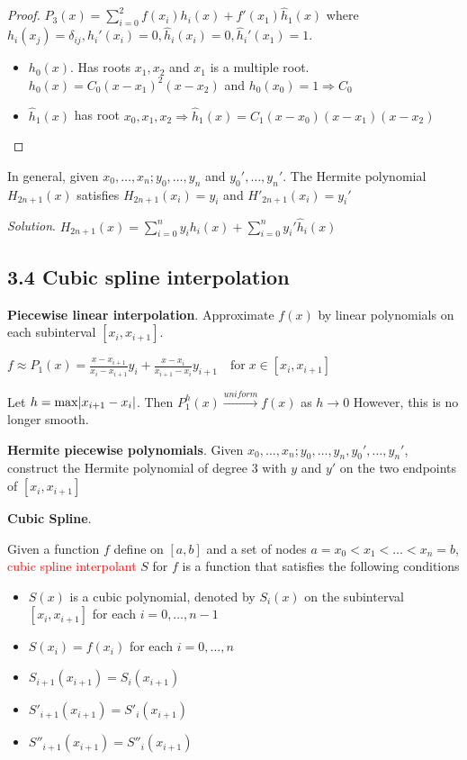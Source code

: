 \documentclass[11pt]{article}
\begin{document}
\begin{proof}
$P_3(x)=\displaystyle\sum_{i=0}^2f(x_i)h_i(x)+f'(x_1)\hat{h}_1(x)$ where
$h_i(x_j)=\delta_{ij},h_i'(x_i)=0,\hat{h}_i(x_i)=0,\hat{h}_i'(x_1)=1$.
\begin{itemize}
\item $h_0(x)$. Has roots $x_1,x_2$ and $x_1$ is a multiple root.
      $h_0(x)=C_0(x-x_1)^2(x-x_2)$ and $h_0(x_0)=1\Longrightarrow C_0$
\item $\hat{h}_1(x)$ has root $x_0,x_1,x_2\Longrightarrow 
      \hat{h}_1(x)=C_1(x-x_0)(x-x_1)(x-x_2)$
\end{itemize}
\end{proof}

In general, given \(x_0,\dots,x_n;y_0,\dots,y_n\) and \(y_0',\dots,y_n'\). The
Hermite polynomial \(H_{2n+1}(x)\) satisfies \(H_{2n+1}(x_i)=y_i\) and
\(H'_{2n+1}(x_i)=y_i'\) 

\emph{Solution}.
\(H_{2n+1}(x)=\displaystyle\sum_{i=0}^ny_ih_i(x)+\displaystyle\sum_{i=0}^ny_i'
   \hat{h}_i(x)\)
\subsection{3.4 Cubic spline interpolation}
\label{sec:org52512c7}
\textbf{Piecewise linear interpolation}. Approximate \(f(x)\) by linear polynomials on
each subinterval \([x_i,x_{i+1}]\).

\(f\approx P_1(x)=\frac{x-x_{i+1}}{x_i-x_{i+1}}y_i+\frac{x-x_i}
   {x_{i+1}-x_i}y_{i+1} \quad\text{for} \;x\in[x_i,x_{i+1}]\) 

Let \(h=\max\abs{x_{i+1}-x_i}\). Then \(P_1^h(x)\xrightarrow{uniform} f(x)\) as
\(h\to 0\) 
However, this is no longer smooth.

\textbf{Hermite piecewise polynomials}. Given
\(x_0,\dots,x_n;y_0,\dots,y_n,y_0',\dots,y_n'\), construct the Hermite
polynomial of degree 3 with \(y\) and \(y'\) on the two endpoints of
\([x_i,x_{i+1}]\)

\textbf{Cubic Spline}.
\begin{definition}
Given a function $f$ define on $[a,b]$ and a set of nodes $a=x_0<x_1<\dots<x_n=b$,
\textcolor{red}{cubic spline interpolant} $S$ for $f$ is a function that satisfies
the following conditions
\begin{itemize}
\item $S(x)$ is a cubic polynomial, denoted by $S_i(x)$ on the subinterval
$[x_i,x_{i+1}]$ for each $i=0,\dots,n-1$
\item $S(x_i)=f(x_i)$ for each $i=0,\dots, n$
\item $S_{i+1}(x_{i+1})=S_i(x_{i+1})$
\item $S'_{i+1}(x_{i+1})=S'_i(x_{i+1})$
\item $S''_{i+1}(x_{i+1})=S''_i(x_{i+1})$
\end{itemize}
\end{definition}
\end{document}
